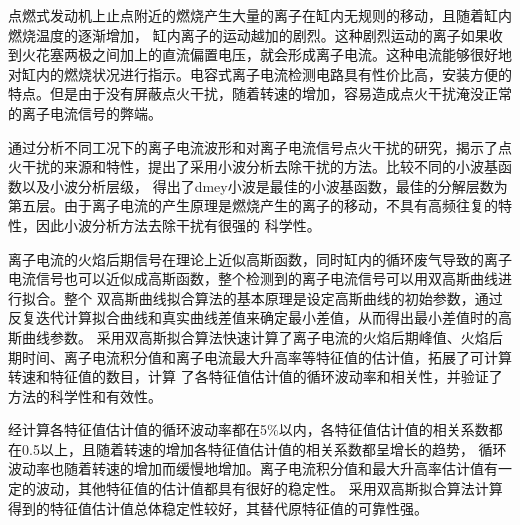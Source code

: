 \begin{cabstract}
点燃式发动机上止点附近的燃烧产生大量的离子在缸内无规则的移动，且随着缸内燃烧温度的逐渐增加，
缸内离子的运动越加的剧烈。这种剧烈运动的离子如果收到火花塞两极之间加上的直流偏置电压，就会形成离子电流。这种电流能够很好地
对缸内的燃烧状况进行指示。电容式离子电流检测电路具有性价比高，安装方便的特点。但是由于没有屏蔽点火干扰，随着转速的增加，容易造成点火干扰淹没正常的离子电流信号的弊端。\par
通过分析不同工况下的离子电流波形和对离子电流信号点火干扰的研究，揭示了点火干扰的来源和特性，提出了采用小波分析去除干扰的方法。比较不同的小波基函数以及小波分析层级，
得出了dmey小波是最佳的小波基函数，最佳的分解层数为第五层。由于离子电流的产生原理是燃烧产生的离子的移动，不具有高频往复的特性，因此小波分析方法去除干扰有很强的
科学性。\par
离子电流的火焰后期信号在理论上近似高斯函数，同时缸内的循环废气导致的离子电流信号也可以近似成高斯函数，整个检测到的离子电流信号可以用双高斯曲线进行拟合。整个
双高斯曲线拟合算法的基本原理是设定高斯曲线的初始参数，通过反复迭代计算拟合曲线和真实曲线差值来确定最小差值，从而得出最小差值时的高斯曲线参数。
采用双高斯拟合算法快速计算了离子电流的火焰后期峰值、火焰后期时间、离子电流积分值和离子电流最大升高率等特征值的估计值，拓展了可计算转速和特征值的数目，计算
了各特征值估计值的循环波动率和相关性，并验证了方法的科学性和有效性。\par
经计算各特征值估计值的循环波动率都在5\%以内，各特征值估计值的相关系数都在0.5以上，且随着转速的增加各特征值估计值的相关系数都呈增长的趋势，
循环波动率也随着转速的增加而缓慢地增加。离子电流积分值和最大升高率估计值有一定的波动，其他特征值的估计值都具有很好的稳定性。
采用双高斯拟合算法计算得到的特征值估计值总体稳定性较好，其替代原特征值的可靠性强。
\end{cabstract}


